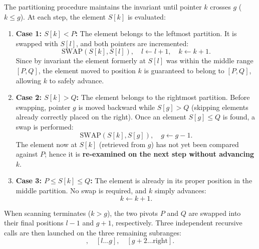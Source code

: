 The partitioning procedure maintains the invariant until pointer $k$ crosses $g$ ($k \le g$). At each step, the element $S[k]$ is evaluated:

\begin{enumerate}
  \item \textbf{Case 1: $S[k] < P$:}
  The element belongs to the leftmost partition. It is swapped with $S[l]$, and both pointers are incremented:
  \begin{equation}
    \text{SWAP}(S[k], S[l]), \quad l \leftarrow l + 1, \quad k \leftarrow k + 1.
  \end{equation}
  Since by invariant the element formerly at $S[l]$ was within the middle range $[P, Q]$, the element moved to position $k$ is guaranteed to belong to $[P, Q]$, allowing $k$ to safely advance.

  \item \textbf{Case 2: $S[k] > Q$:}
  The element belongs to the rightmost partition. Before swapping, pointer $g$ is moved backward while $S[g] > Q$ (skipping elements already correctly placed on the right). Once an element $S[g] \le Q$ is found, a swap is performed:
  \begin{equation}
    \text{SWAP}(S[k], S[g]), \quad g \leftarrow g - 1.
  \end{equation}
  The element now at $S[k]$ (retrieved from $g$) has not yet been compared against $P$; hence it is \textbf{re-examined on the next step without advancing $k$}.

  \item \textbf{Case 3: $P \le S[k] \le Q$:}
  The element is already in its proper position in the middle partition. No swap is required, and $k$ simply advances:
  \begin{equation}
    k \leftarrow k + 1.
  \end{equation}
\end{enumerate}

When scanning terminates ($k > g$), the two pivots $P$ and $Q$ are swapped into their final positions $l - 1$ and $g + 1$, respectively. Three independent recursive calls are then launched on the three remaining subranges:
\begin{equation}
  [\text{left} \dots l - 2], \quad [l \dots g], \quad [g + 2 \dots \text{right}].
\end{equation}

